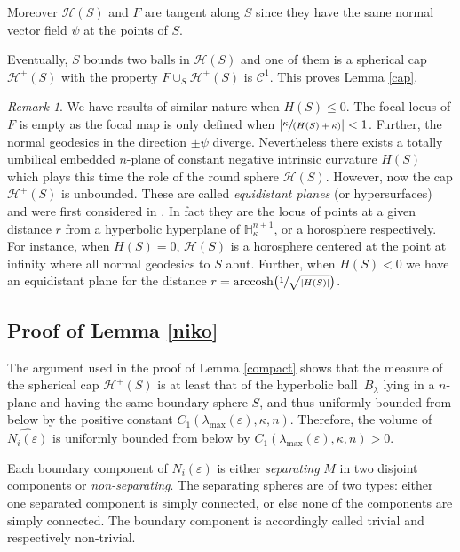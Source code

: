 \documentclass[JEP,XML,SOM,Unicode]{cedram}
\let\mathcal\mathscr
\DeclareMathOperator{\arccosh}{arccosh}
\newcommand{\spfrac}[2]{\sfrac{#1}{(#2)}}
\theoremstyle{definition}
\theoremstyle{remark}
\newtheorem{remark}[theorem]{Remark}
\numberwithin{equation}{section}
\begin{document}
Moreover $\mathcal H(S)$ and $F$ are tangent along $S$ since they have the same
normal vector field $\psi$ at the points of $S$.

Eventually, $S$ bounds two balls in $\mathcal H(S)$ and one of them is a spherical cap
$\mathcal H^+(S)$ with the property $F\cup_S\mathcal H^+(S)$
is $\mathcal C^1$. This proves Lemma \ref{cap}.

\begin{remark}
We have results of similar nature when $H(S) \leq 0$. The focal locus of $F$ is empty as
the focal map is only defined when $\left|\spfrac{\kappa}{H(S)+\kappa}\right| <1$.
Further, the normal geodesics in the direction
$\pm \psi$ diverge. Nevertheless there exists a totally umbilical embedded
$n$-plane of constant negative intrinsic curvature $H(S)$
which plays this time the role of the round sphere $\mathcal H(S)$.
However, now the cap $\mathcal H^+(S)$ is unbounded.
These are called \emph{equidistant planes} (or hypersurfaces) and were
first considered in \cite{CR1}. In fact they are the locus of points at
a given distance $r$ from a hyperbolic hyperplane
of $\mathbb H^{n+1}_{\kappa}$, or a horosphere respectively.
For instance, when $H(S)=0$, $\mathcal H(S)$ is a
horosphere centered at the point at
infinity where all normal geodesics to $S$ abut.
Further, when $H(S) <0$ we have an equidistant plane for the distance
$r= \arccosh\bigl(\sfrac{1}{\sqrt{|H(S)|}}\bigr)$.
\end{remark}

\subsection{Proof of Lemma \ref{niko} }\label{proofniko}
The argument used in the proof of Lemma \ref{compact} shows that
the measure of the spherical cap $\mathcal H^+(S)$ is at least that of the hyperbolic ball~$B_{\lambda}$ lying in a $n$-plane and having the same boundary sphere $S$, and thus uniformly
bounded from below by the positive constant $C_1(\lambda_{\max}(\varepsilon),\kappa, n)$.
Therefore, the volume of $\widehat{N_i(\varepsilon)}$
is uniformly bounded from below by $C_1(\lambda_{\max}(\varepsilon), \kappa, n) >0$.

Each boundary component of $N_i(\varepsilon)$ is either \emph{separating} $M$ in two disjoint components or
\emph{non-separating}. The separating spheres are of two types: either one separated component is
simply connected, or else none of the components are simply connected.
The boundary component is accordingly called trivial and respectively non-trivial.
\end{document}

